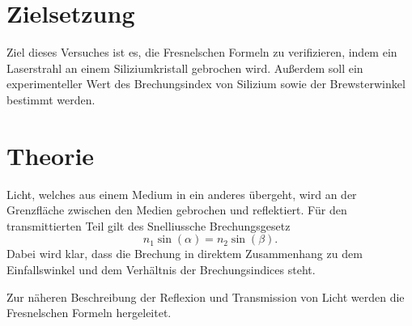 \section{Zielsetzung}
Ziel dieses Versuches ist es, die Fresnelschen Formeln zu verifizieren, indem 
ein Laserstrahl an einem Siliziumkristall gebrochen wird.
Außerdem soll ein experimenteller Wert des Brechungsindex von Silizium sowie der
Brewsterwinkel bestimmt werden.

\section{Theorie}
\label{sec:Theorie}
Licht, welches aus einem Medium in ein anderes übergeht, wird an der Grenzfläche
zwischen den Medien gebrochen und reflektiert.
Für den transmittierten Teil gilt des Snelliussche Brechungsgesetz
\begin{equation}
    n_1\sin(\alpha) = n_2 \sin(\beta). \label{eq:snellius}
\end{equation}
Dabei wird klar, dass die Brechung in direktem Zusammenhang zu dem Einfallswinkel
und dem Verhältnis der Brechungsindices steht.

Zur näheren Beschreibung der Reflexion und Transmission von Licht werden die Fresnelschen Formeln hergeleitet.

